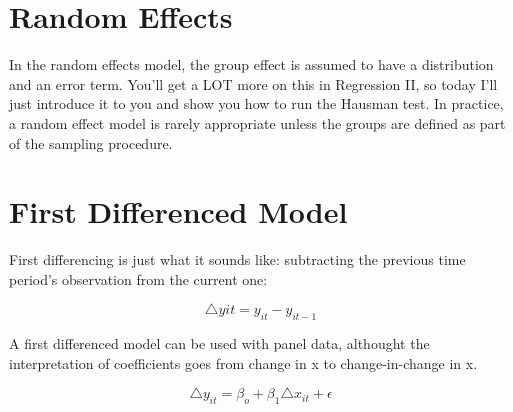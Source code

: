 \documentclass[12pt]{article}
\begin{document}
\section{Random Effects}

In the random effects model, the group effect is assumed to have a
distribution and an error term. You'll get a LOT more on this in
Regression II, so today I'll just introduce it to you and show you how
to run the Hausman test.  In practice, a random effect model is rarely
appropriate unless the groups are defined as part of the sampling
procedure. 

\section{First Differenced Model}

First differencing is just what it sounds like: subtracting the
previous time period's observation from the current one:

\begin{equation*}
  \triangle y{it}= y_{it}-y_{it-1}
\end{equation*}

A first differenced model can be used with panel data, althought the
interpretation of coefficients goes from change in x to
change-in-change in x. 

\begin{equation*}
  \triangle y_{it}=\beta_o+\beta_1 \triangle x_{it} + \epsilon
\end{equation*}
\end{document}
